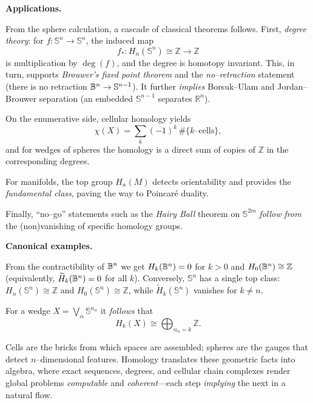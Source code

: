 \begin{remark}
\textbf{Applications.}

From the sphere calculation, a cascade of classical theorems follows.
First, \emph{degree theory}: for $f:\mathbb{S}^n \to \mathbb{S}^n$, the induced map
\[
f_*:H_n(\mathbb{S}^n)\cong\mathbb{Z}\longrightarrow\mathbb{Z}
\]
is multiplication by $\deg(f)$, and the degree is homotopy invariant. This, in turn, supports \emph{Brouwer’s fixed point theorem} and the \emph{no–retraction} statement (there is no retraction $\mathbb{B}^n\to\mathbb{S}^{n-1}$). It further \emph{implies} Borsuk--Ulam and Jordan--Brouwer separation (an embedded $\mathbb{S}^{n-1}$ separates $\mathbb{R}^n$).

On the enumerative side, cellular homology yields
\[
\chi(X)=\sum_k(-1)^k\,\#\{\text{$k$–cells}\},
\]
and for wedges of spheres the homology is a direct sum of copies of $\mathbb{Z}$ in the corresponding degrees.

For manifolds, the top group $H_n(M)$ detects orientability and provides the \emph{fundamental class}, paving the way to Poincar\'e duality.

Finally, ``no–go'' statements such as the \emph{Hairy Ball} theorem on $\mathbb{S}^{2m}$ \emph{follow from} the (non)vanishing of specific homology groups.

\textbf{Canonical examples.}

From the contractibility of $\mathbb{B}^n$ we get $H_k(\mathbb{B}^n)=0$ for $k>0$ and $H_0(\mathbb{B}^n)\cong\mathbb{Z}$ (equivalently, $\widetilde{H}_k(\mathbb{B}^n)=0$ for all $k$). Conversely, $\mathbb{S}^n$ has a single top class: $H_n(\mathbb{S}^n)\cong\mathbb{Z}$ and $H_0(\mathbb{S}^n)\cong\mathbb{Z}$, while $\widetilde{H}_k(\mathbb{S}^n)$ vanishes for $k\neq n$. 

For a wedge $X=\bigvee_\alpha \mathbb{S}^{n_\alpha}$ it \emph{follows} that
\[
H_k(X)\cong \bigoplus_{n_\alpha=k}\mathbb{Z}.
\]

Cells are the bricks from which spaces are assembled; spheres are the gauges that detect $n$–dimensional features. Homology translates these geometric facts into algebra, where exact sequences, degrees, and cellular chain complexes render global problems \emph{computable} and \emph{coherent}—each step \emph{implying} the next in a natural flow.
\end{remark}

